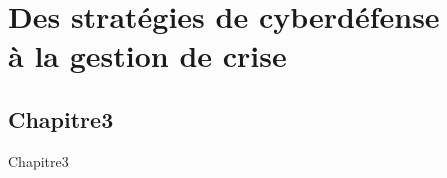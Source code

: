 
\part[Sécurité opérationnelle]{Des stratégies de cyberdéfense\\à la gestion de crise}


\chapter{Chapitre3}
Chapitre3



